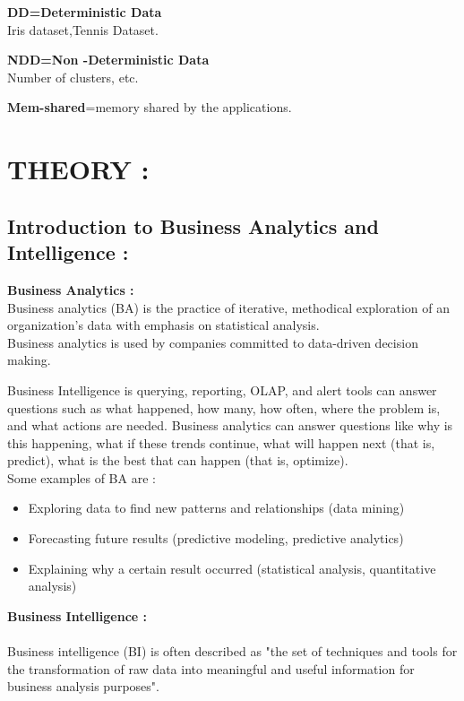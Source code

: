 \documentclass[a4paper,12pt]{article}
\begin{document}
	{\rmfamily
		\textbf{DD=Deterministic Data}\\
		Iris dataset,Tennis Dataset.
	}
	
	{\rmfamily
		\textbf{NDD=Non -Deterministic Data}\\
		Number of clusters, etc.}
	
	{\rmfamily
		\textbf{Mem-shared}=memory shared by the applications.}
	
	
	\bigskip

\section{THEORY : }

\subsection{Introduction to Business Analytics and Intelligence :}

\textbf{Business Analytics :}\\
Business analytics (BA) is the practice of iterative, methodical exploration of an organization's data with emphasis on statistical analysis.\\ Business analytics is used by companies committed to data-driven decision making.


Business Intelligence is querying, reporting, OLAP, and alert tools can answer questions such as what happened, how many, how often, where the problem is, and what actions are needed. Business analytics can answer questions like why is this happening, what if these trends continue, what will happen next (that is, predict), what is the best that can happen (that is, optimize).\\

Some examples of BA are :

\begin{itemize}
	\item Exploring data to find new patterns and relationships (data mining)
	\item Forecasting future results (predictive modeling, predictive analytics)
	\item Explaining why a certain result occurred (statistical analysis, quantitative analysis)
\end{itemize}
	

\textbf{Business Intelligence :}\\
\\
Business intelligence (BI) is often described as "the set of techniques and tools for the transformation of raw data into meaningful and useful information for business analysis purposes".  
\end{document}

